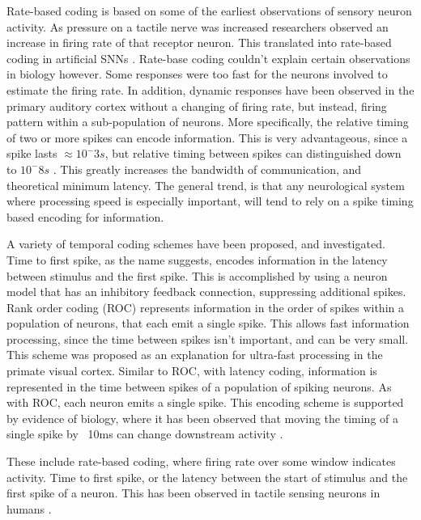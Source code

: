     Rate-based coding is based on some of the earliest observations of sensory
    neuron activity. As pressure on a tactile nerve was increased researchers
    observed an increase in firing rate of that receptor neuron. This translated
    into rate-based coding in artificial SNNs \cite{ponulak_2011}. Rate-base
    coding couldn't explain certain observations in biology however. Some
    responses were too fast for the neurons involved to estimate the firing
    rate. In addition, dynamic responses have been observed in the primary
    auditory cortex without a changing of firing rate, but instead, firing
    pattern within a sub-population of neurons. More specifically, the relative
    timing of two or more spikes can encode information. This is very
    advantageous, since a spike lasts $\approx 10^-3s$, but relative timing
    between spikes can distinguished down to $10^-8s$ \cite{ponulak_2011}. This
    greatly increases the bandwidth of communication, and theoretical minimum
    latency. The general trend, is that any neurological system where processing
    speed is especially important, will tend to rely on a spike timing based
    encoding for information.
    
    A variety of temporal coding schemes have been proposed, and
    investigated. Time to first spike, as the name suggests, encodes information
    in the latency between stimulus and the first spike. This is accomplished by
    using a neuron model that has an inhibitory feedback connection, suppressing
    additional spikes. Rank order coding (ROC) represents information in the
    order of spikes within a population of neurons, that each emit a single
    spike. This allows fast information processing, since the time between
    spikes isn't important, and can be very small. This scheme was proposed as
    an explanation for ultra-fast processing in the primate visual
    cortex. Similar to ROC, with latency coding, information is represented in
    the time between spikes of a population of spiking neurons. As with ROC,
    each neuron emits a single spike. This encoding scheme is supported by
    evidence of biology, where it has been observed that moving the timing of a
    single spike by ~10ms can change downstream activity \cite{ponulak_2011}.
    
    These include rate-based coding, where firing rate over some window
    indicates activity. Time to first spike, or the latency between the start of
    stimulus and the first spike of a neuron. This has been observed in tactile
    sensing neurons in humans \cite{ponulak_2011}.
    
